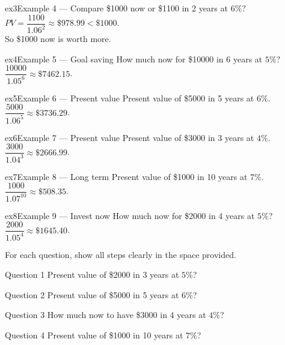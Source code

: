 \documentclass[11pt]{article}
\begin{document}
\begin{example}{ex3}{Example 4 --- Compare}
\$1000 now or \$1100 in 2 years at $6\%$?\soln $PV=\dfrac{1100}{1.06^2}\approx\$978.99<\$1000$. \\ So \$1000 now is worth more.
\end{example}

\begin{example}{ex4}{Example 5 --- Goal saving}
How much now for \$10000 in 6 years at $5\%$?\soln $\dfrac{10000}{1.05^6}\approx\$7462.15$.
\end{example}

\begin{example}{ex5}{Example 6 --- Present value}
Present value of \$5000 in 5 years at $6\%$.\soln $\dfrac{5000}{1.06^5}\approx\$3736.29$.
\end{example}

\begin{example}{ex6}{Example 7 --- Present value}
Present value of \$3000 in 3 years at $4\%$.\soln $\dfrac{3000}{1.04^3}\approx\$2666.99$.
\end{example}

\begin{example}{ex7}{Example 8 --- Long term}
Present value of \$1000 in 10 years at $7\%$.\soln $\dfrac{1000}{1.07^{10}}\approx\$508.35$.
\end{example}

\begin{example}{ex8}{Example 9 --- Invest now}
How much now for \$2000 in 4 years at $5\%$?\soln $\dfrac{2000}{1.05^4}\approx\$1645.40$.
\end{example}

\clearpage
{}
For each question, show all steps clearly in the space provided.

\begin{qbox}{Question 1}
Present value of \$2000 in 3 years at $5\%$?\workspace{2.4cm}
\end{qbox}

\begin{qbox}{Question 2}
Present value of \$5000 in 5 years at $6\%$?\workspace{2.4cm}
\end{qbox}

\begin{qbox}{Question 3}
How much now to have \$3000 in 4 years at $4\%$?\workspace{2.4cm}
\end{qbox}

\begin{qbox}{Question 4}
Present value of \$1000 in 10 years at $7\%$?\workspace{2.4cm}
\end{qbox}
\end{document}
